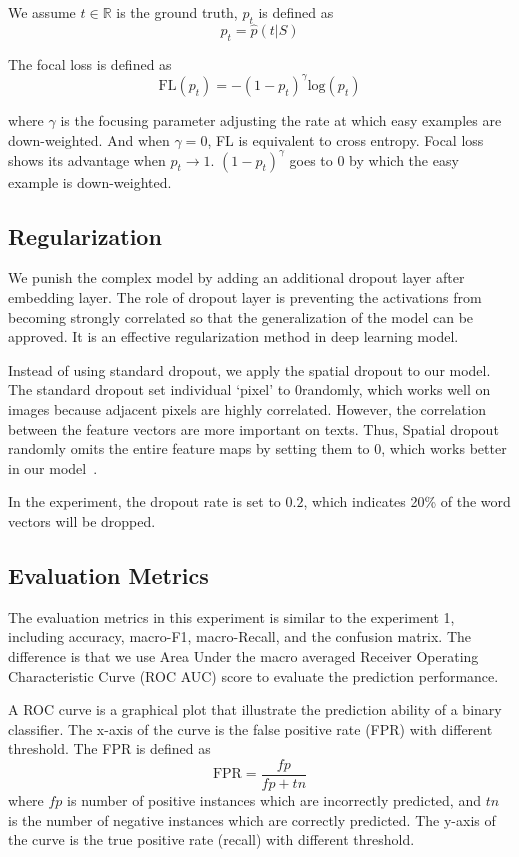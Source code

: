We assume $t\in \mathbb{R}$ is the ground truth, $p_t$ is defined as 
\begin{equation}
p_t = \hat{p}(t|S)
\end{equation}

The focal loss is defined as 
\begin{equation}
\mbox{FL}(p_t) = -(1-p_t)^\gamma \mbox{log}(p_t)
\end{equation}

where $\gamma$ is the focusing parameter adjusting the rate at which easy examples are down-weighted. And when $\gamma = 0$, FL is equivalent to cross entropy. Focal loss shows its advantage when $p_t \rightarrow 1$. $(1-p_t)^\gamma$ goes to $0$ by which the easy example is down-weighted.


\subsection{Regularization}
We punish the complex model by adding an additional dropout layer after embedding layer. The role of dropout layer is preventing the activations from becoming strongly correlated so that the generalization of the model can be approved. It is an effective regularization method in deep learning model.

Instead of using standard dropout, we apply the spatial dropout to our model. The standard dropout set individual `pixel' to $0$randomly, which works well on images because adjacent pixels are highly correlated. However, the correlation between the feature vectors are more important on texts. Thus, Spatial dropout randomly omits the entire feature maps by setting them to $0$, which works better in our model~\cite{tompson2015efficient}.

In the experiment, the dropout rate is set to $0.2$, which indicates 20\% of the word vectors will be dropped.

\subsection{Evaluation Metrics}
The evaluation metrics in this experiment is similar to the experiment 1, including accuracy, macro-F1, macro-Recall, and the confusion matrix. The difference is that we use Area Under the macro averaged Receiver Operating Characteristic Curve (ROC AUC) score to evaluate the prediction performance.

A ROC curve is a graphical plot that illustrate the prediction ability of a binary classifier. The x-axis of the curve is the false positive rate (FPR) with different threshold. The FPR is defined as 
\begin{equation}
\mbox{FPR} = \frac{fp}{fp+tn}
\end{equation}
where $fp$ is number of positive instances which are incorrectly predicted, and $tn$ is the number of negative instances which are correctly predicted. The y-axis of the curve is the true positive rate (recall) with different threshold. 

